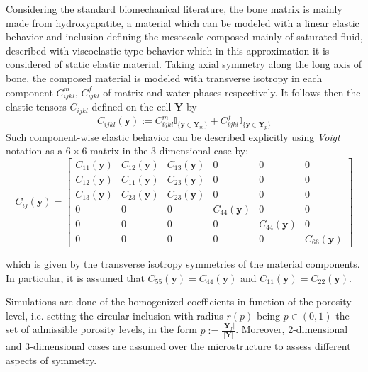 Considering the standard biomechanical literature, the bone matrix is mainly made from hydroxyapatite, a material which can be modeled with a linear elastic behavior and inclusion defining the mesoscale composed mainly of saturated fluid, described with viscoelastic type behavior which in this approximation it is considered of static elastic material. Taking axial symmetry along the long axis of bone, the composed material is modeled with transverse isotropy in each component $C^m_{ijkl}$, $C^f_{ijkl}$ of matrix and water phases respectively.
It follows then the elastic tensors $C_{ijkl}$ defined on the cell $\mathbf{Y}$ by
\begin{equation*}
    C_{ijkl} (\mathbf{y}) := C^m_{ijkl} \mathbb{I}_{\{\mathbf{y} \in  \mathbf{Y}_{m}\}} + C^f_{ijkl} \mathbb{I}_{\{ \mathbf{y} \in \mathbf{Y}_{p}\}}
\end{equation*}
Such component-wise elastic behavior can be described explicitly using \textit{Voigt} notation as a $6\times 6$ matrix in the 3-dimensional case by:
\begin{equation*}
    C_{ij}(\mathbf{y}) = 
    \begin{bmatrix}
    C_{11}(\mathbf{y}) & C_{12}(\mathbf{y}) & C_{13}(\mathbf{y}) & 0 & 0 & 0 \\
    C_{12}(\mathbf{y}) & C_{11}(\mathbf{y}) & C_{23}(\mathbf{y}) & 0 & 0 & 0 \\
    C_{13}(\mathbf{y}) & C_{23}(\mathbf{y}) & C_{23}(\mathbf{y}) & 0 & 0 & 0 \\
    0 & 0 & 0 & C_{44}(\mathbf{y}) & 0 & 0 \\
    0 & 0 & 0 & 0 & C_{44}(\mathbf{y}) & 0 \\
    0 & 0 & 0 & 0 & 0 & C_{66}(\mathbf{y}) 
    \end{bmatrix}
\end{equation*}

which is given by the transverse isotropy symmetries of the material components. In particular, it is assumed that $C_{55}(\mathbf{y}) = C_{44}(\mathbf{y})$ and $C_{11}(\mathbf{y}) = C_{22}(\mathbf{y})$.

Simulations are done of the homogenized coefficients in function of the porosity level, i.e. setting the circular inclusion with radius $r(p)$ being $p \in (0,1)$ the set of admissible porosity levels, in the form $ p := \frac{\vert \mathbf{Y}_f \vert }{\vert \mathbf{Y}\vert} $. Moreover, 2-dimensional and 3-dimensional cases are assumed over the microstructure to assess different aspects of symmetry.

